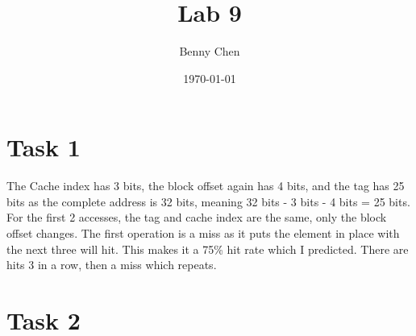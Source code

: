 \documentclass{article}
\title{Lab 9}
\author{Benny Chen}
\date{\today}
\begin{document}
\maketitle

\section*{Task 1}

\begin{table}[h]
\end{table}

\noindent
The Cache index has 3 bits, the block offset again has 4 bits, and the tag has 25 bits
as the complete address is 32 bits, meaning 32 bits - 3 bits - 4 bits = 25 bits. 
For the first 2 accesses, the tag and cache index are the same, only the block offset changes.
The first operation is a miss as it puts the element in place with the next three will hit.
This makes it a 75\% hit rate which I predicted. There are hits 3 in a row, then a miss which repeats.

\section*{Task 2}
\end{document}
